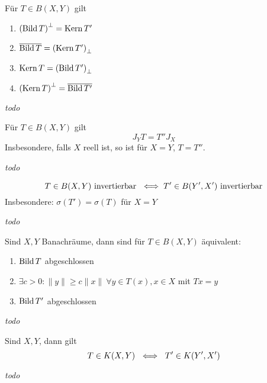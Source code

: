 \newpage %

\begin{prop}
	Für $T \in B(X, Y)$ gilt
	\begin{enumerate}[label=(\roman*\upshape)]
		\item $\left( \mathop{\rm Bild}\nolimits T \right)^{\bot} = \mathop{\rm Kern}\nolimits T'$
		\item $\overline{\mathop{\rm Bild}\nolimits T} = \left( \mathop{\rm Kern}\nolimits T' \right)_{\bot}$
		\item $\mathop{\rm Kern}\nolimits T = \left( \mathop{\rm Bild}\nolimits T' \right)_{\bot}$
		\item $\left( \mathop{\rm Kern}\nolimits T \right)^{\bot} = \overline{\mathop{\rm Bild}\nolimits T'}$
	\end{enumerate}
\end{prop}

\begin{beweis}
	\textit{todo} %
\end{beweis}


\begin{prop}
	Für $T \in B(X, Y)$ gilt
	\[ J_{Y} T = T'' J_{X} \]
	Insbesondere, falls $X$ reell ist, so ist für $X = Y$, $T = T''$.
\end{prop}

\begin{beweis}
	\textit{todo} %
\end{beweis}


\begin{satz}
	\[ T \in B(X, Y) \text{ invertierbar } \iff T' \in B(Y', X') \text{ invertierbar} \]
	Insbesondere: $\sigma(T') = \sigma(T)$ für $X = Y$
\end{satz}

\begin{beweis}
	\textit{todo} %
\end{beweis}


\begin{satz} 
	Sind $X, Y$ Banachräume, dann sind für $T \in B(X, Y)$  äquivalent:
	\begin{enumerate}[label=(\roman*\upshape)]
		\item $\mathop{\rm Bild}\nolimits T$ abgeschlossen
		\item $\exists c > 0 : \| y \| \geq c \| x \| ~ \forall y \in T(x), x \in X$ mit $T x = y$
		\item $\mathop{\rm Bild}\nolimits T'$ abgeschlossen
	\end{enumerate}
\end{satz}

\begin{beweis}
	\textit{todo} %
\end{beweis}


\begin{satz}[Schauder] 
	Sind $X, Y$,  dann gilt
	\[ T \in K(X, Y) ~ \iff ~ T' \in K(Y', X') \]
\end{satz}

\begin{beweis}
	\textit{todo} %
\end{beweis}


\newpage